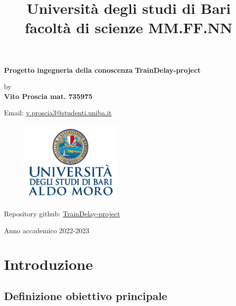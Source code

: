 \documentclass[italian,12pt,a4paper]{article}
\title{Università degli studi di Bari facoltà di scienze MM.FF.NN}
\date{} %
\begin{document}
	\maketitle
	\thispagestyle{empty}
	\begin{center}
		\huge \textbf{Progetto ingegneria della conoscenza}
		\linebreak
		\linebreak
		\Large \textbf{TrainDelay-project}
	\end{center}
	
	\begin{center}
		by \\
		\Large \textbf{Vito Proscia mat. 735975} \\
	\end{center}
	\vspace{4px}
	\begin{center}
		Email: \href{mailto:v.proscia3@studenti.uniba.it}{v.proscia3@studenti.uniba.it}
	\end{center}
	\vspace{50px}
	\begin{figure}[hb]
		\centering
		\includegraphics[width=5cm]{image.png}
	\end{figure}
	\vspace{50px}
	\begin{center}
		Repository github: \href{https://github.com/Giut0/TrainDelay-project}{TrainDelay-project}
	\end{center}
	
	\vfill
	\begin{center}
		Anno accademico 2022-2023
	\end{center}
	
	\newpage
	
	\tableofcontents

	\newpage

	\section{Introduzione}
	
		\subsection{Definizione obiettivo principale}
		
\end{document}
